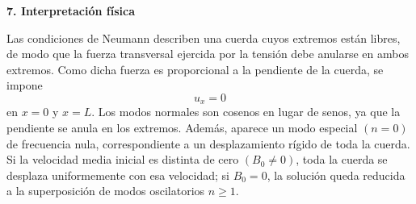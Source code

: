 \documentclass[11pt,spanish]{article}
\begin{document}
{\bf 7. Interpretación física}

Las condiciones de Neumann describen una cuerda cuyos extremos están libres, de modo que la fuerza transversal ejercida por la tensión debe anularse en ambos extremos. Como dicha fuerza es proporcional a la pendiente de la cuerda, se impone
$$
u_x=0
$$
en $x=0$ y $x=L$.
Los modos normales son cosenos en lugar de senos, ya que la pendiente se anula en los extremos. 
Además, aparece un modo especial $(n=0)$ de frecuencia nula, correspondiente a un desplazamiento rígido de toda la cuerda. 
Si la velocidad media inicial es distinta de cero $(B_0\neq0)$, toda la cuerda se desplaza uniformemente con esa velocidad; si $B_0=0$, la solución queda reducida a la superposición de modos oscilatorios $n\ge1$.





 
%
%
\end{document}
